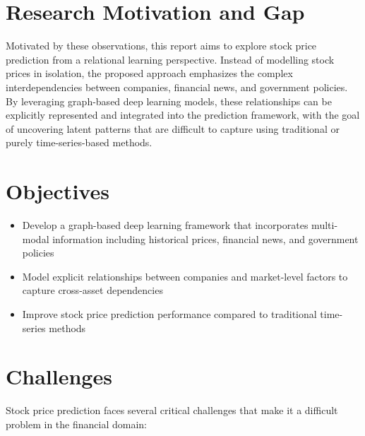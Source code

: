 \section{Research Motivation and Gap}

Motivated by these observations, this report aims to explore stock price prediction from a relational learning perspective. Instead of modelling stock prices in isolation, the proposed approach emphasizes the complex interdependencies between companies, financial news, and government policies. By leveraging graph-based deep learning models, these relationships can be explicitly represented and integrated into the prediction framework, with the goal of uncovering latent patterns that are difficult to capture using traditional or purely time-series-based methods.

\section{Objectives}
\begin{itemize}
    \item Develop a graph-based deep learning framework that incorporates multi-modal information including historical prices, financial news, and government policies
    \item Model explicit relationships between companies and market-level factors to capture cross-asset dependencies
    \item Improve stock price prediction performance compared to traditional time-series methods
\end{itemize}

\section{Challenges}

Stock price prediction faces several critical challenges that make it a difficult problem in the financial domain:

